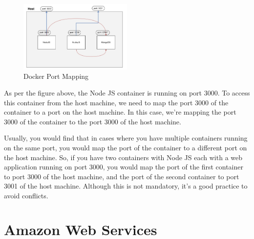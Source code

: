 \documentclass[a4paper]{article}
\begin{document}
    \begin{figure}[h]
        \centering
        \includegraphics[width=0.5\textwidth]{img/docker-port-mapping.png}
        \caption{Docker Port Mapping}
        \label{fig:docker-port-mapping}
    \end{figure}

    As per the figure above, the Node JS container is running on port 3000. To access this container from the host machine, we need to map the port 3000 of the container to a port on the host machine. In this case, we're mapping the port 3000 of the container to the port 3000 of the host machine. 

    Usually, you would find that in cases where you have multiple containers running on the same port, you would map the port of the container to a different port on the host machine. So, if you have two containers with Node JS each with a web application running on port 3000, you would map the port of the first container to port 3000 of the host machine, and the port of the second container to port 3001 of the host machine. Although this is not mandatory, it's a good practice to avoid conflicts.




    \subsection{}
    \subsection{}
    
    \newpage
    \section{Amazon Web Services}
    \subsection{}
    \subsection{}
    
\end{document}
